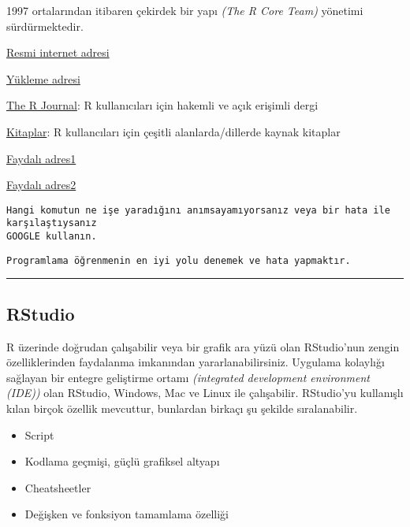 \documentclass[
]{book}
\begin{document}
1997 ortalarından itibaren çekirdek bir yapı \emph{(The R Core Team)} yönetimi sürdürmektedir.

\href{http://www.r-project.org}{Resmi internet adresi}

\href{http://www.cran.r-project.org}{Yükleme adresi}

\href{https://journal.r-project.org}{The R Journal}: R kullanıcıları için hakemli ve açık erişimli dergi

\href{https://www.r-project.org/doc/bib/R-books.html}{Kitaplar}: R kullancıları için çeşitli alanlarda/dillerde kaynak kitaplar

\href{http://www.statmethods.net}{Faydalı adres1}

\href{https://stackoverflow.com/questions/tagged/r}{Faydalı adres2}

\begin{verbatim}
Hangi komutun ne işe yaradığını anımsayamıyorsanız veya bir hata ile karşılaştıysanız
GOOGLE kullanın.
\end{verbatim}

\begin{verbatim}
Programlama öğrenmenin en iyi yolu denemek ve hata yapmaktır.
\end{verbatim}

\begin{center}\rule{0.5\linewidth}{0.5pt}\end{center}

\hypertarget{rstudio}{%
\subsection{RStudio}\label{rstudio}}

R üzerinde doğrudan çalışabilir veya bir grafik ara yüzü olan RStudio'nun zengin özelliklerinden faydalanma imkanından yararlanabilirsiniz. Uygulama kolaylığı sağlayan bir entegre geliştirme ortamı \emph{(integrated development environment (IDE))} olan RStudio, Windows, Mac ve Linux ile çalışabilir. RStudio'yu kullanışlı kılan birçok özellik mevcuttur, bunlardan birkaçı şu şekilde sıralanabilir.

\begin{itemize}
\item
  Script
\item
  Kodlama geçmişi, güçlü grafiksel altyapı
\item
  Cheatsheetler
\item
  Değişken ve fonksiyon tamamlama özelliği
\end{itemize}
\end{document}
